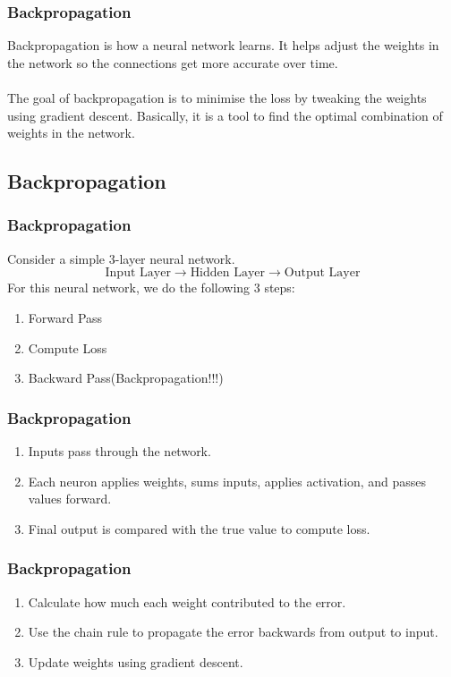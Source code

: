 \documentclass{beamer}
\begin{document}
\begin{frame}
\frametitle{Backpropagation}
\begin{tcolorbox}
[colback=blue!5!white,colframe=blue!75!black,title= Why Backpropagation?]
Backpropagation is how a neural network learns. It helps adjust the weights in the network so the connections get more accurate over time. \\
\\
The goal of backpropagation is to minimise the loss by tweaking the weights using gradient descent. Basically, it is a tool to find the optimal combination of weights in the network.
\end{tcolorbox} 
\end{frame}
\begin{frame}
\section{Backpropagation}
\frametitle{Backpropagation}
\begin{tcolorbox}
[colback=blue!5!white,colframe=blue!75!black,title=How Backpropagation Works]
Consider a simple 3-layer neural network.
$$\text{Input Layer}\rightarrow\text{Hidden Layer}\rightarrow\text{Output Layer}$$
For this neural network, we do the following 3 steps:
\begin{enumerate}
    \item Forward Pass
    \item Compute Loss
    \item Backward Pass(Backpropagation!!!)
\end{enumerate}
\end{tcolorbox}
\end{frame}
\begin{frame}
\frametitle{Backpropagation}
\begin{tcolorbox}
[colback=blue!5!white,colframe=blue!75!black,title= Forward Pass and Computing Loss]
\begin{enumerate}
    \item Inputs pass through the network.
    \item Each neuron applies weights, sums inputs, applies activation, and passes values forward.
    \item Final output is compared with the true value to compute loss.
\end{enumerate}
\end{tcolorbox}
\end{frame}
\begin{frame}
\frametitle{Backpropagation}
\begin{tcolorbox}
[colback=blue!5!white,colframe=blue!75!black,title=Backward Pass(Backpropagation)]
\begin{enumerate}
    \item Calculate how much each weight contributed to the error.
    \item Use the chain rule to propagate the error backwards from output to input.
    \item Update weights using gradient descent.
\end{enumerate}
\end{tcolorbox}
\end{frame}
\end{document}
